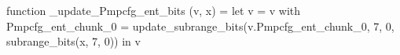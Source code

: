 function _update_Pmpcfg_ent_bits (v, x) = let v = { v with Pmpcfg_ent_chunk_0 = update_subrange_bits(v.Pmpcfg_ent_chunk_0, 7, 0, subrange_bits(x, 7, 0)) } in
  v
